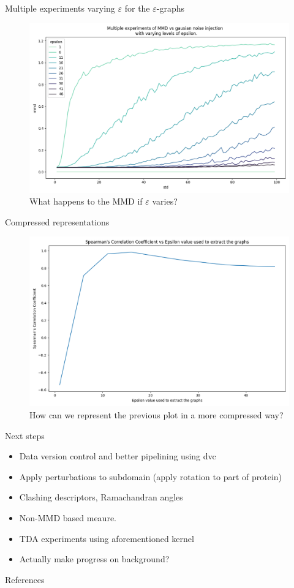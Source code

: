 \documentclass[aspectratio=169, 10pt, dvipsnames, handout]{beamer}
\begin{document}
\begin{frame}[fragile]{Multiple experiments varying $\varepsilon$ for the
    $\varepsilon$-graphs}
  \begin{figure}%
    \centering
    \includegraphics[width=.7\textwidth]{./figures/plot_multiple_experiments.png}
    \caption{What happens to the MMD if $\varepsilon$ varies?}%
  \end{figure}
\end{frame}

\begin{frame}[fragile]{Compressed representations}
  \begin{figure}%
    \centering
    \includegraphics[width=.7\textwidth]{./figures/plot_correlations.png}
    \caption{How can we represent the previous plot in a more compressed way?}%
  \end{figure}
\end{frame}

\begin{frame}[fragile]{Next steps}
  \begin{itemize}
  \item Data version control and better pipelining using dvc
  \item Apply perturbations to subdomain (apply rotation to part of protein)
  \item Clashing descriptors, Ramachandran angles
  \item Non-MMD based meaure. \cite{thompson2022evaluation}
  \item TDA experiments using aforementioned kernel
  \item Actually make progress on background?
  \end{itemize}
\end{frame}


\begin{frame}[allowframebreaks]{References}

  
  

\end{frame}
\end{document}
